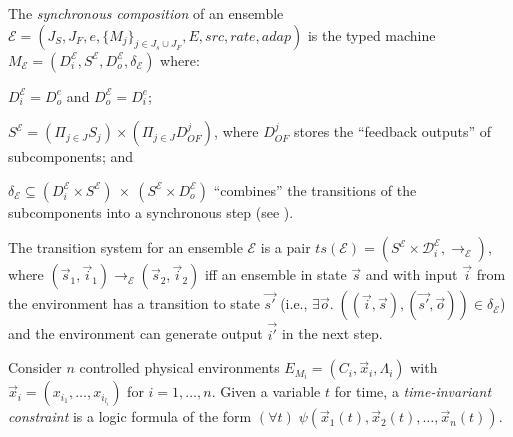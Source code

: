 \begin{definition}
The \emph{synchronous composition}
of  an ensemble
$\mathcal{E} = (J_S, J_F, e, \{M_j\}_{j\in J_s \cup J_F}, E, \mathit{src}, \mathit{rate}, \mathit{adap})$
is the typed machine
$ M_{\mathcal{E}} = ( D_i^{\mathcal{E}}, S^{\mathcal{E}},D_o^{\mathcal{E}}, \delta_{\mathcal{E}})$
where:
\begin{inparaenum}[(i)]
	\item $D_i^{\mathcal{E}} = D^e_o$ and  $D_o^{\mathcal{E}} = D^e_i$;
	\item $S^{\mathcal{E}} = (\Pi_{j\in J} S_j) \times (\Pi_{j\in J} D_{OF}^j)$, 
	where
	$D^j_{OF}$ stores the ``feedback outputs'' of subcomponents; and
	\item $ \delta_{\mathcal{E}} \subseteq 
	(D^{\mathcal{E}}_i\times S^{\mathcal{E}}) \:\times \: (S^{\mathcal{E}} \times D_o^{\mathcal{E}})$
	``combines''  the  transitions of the subcomponents
	 into a synchronous step (see \cite{pals-tcs}).
\end{inparaenum}
\end{definition}

\begin{definition}
The transition system for an ensemble $\mathcal{E}$ is a pair 
$\mathit{ts}(\mathcal{E}) = (S^{\mathcal{E}} \times \mathcal{D}_i^{\mathcal{E}}, \longrightarrow_{\mathcal{E}})$,
where $(\vec{s}_1,\vec{i}_1) \longrightarrow_{\mathcal{E}} (\vec{s}_2,\vec{i}_2)$
iff an ensemble in state $\vec{s}$ and with input
$\vec{i}$ from the environment has a transition to state $\vec{s'}$
(i.e., $\exists \vec{o}.\; ((\vec{i}, \vec{s}), (\vec{s'}, \vec{o})) \in \delta_{\mathcal{E}}$)
and the environment can generate output $\vec{i'}$ in the next step.
\end{definition}


\begin{definition}  
Consider $n$ controlled physical environments
$E_{M_i} = (C_i, {\vec{x}}_i, \Lambda_i)$
with $\vec{x}_i =  (x_{i_1}, \ldots,x_{i_{l_i}})$
for $i = 1,\ldots,n$.
Given a variable $t$ for time,
a \emph{time-invariant constraint}
is a logic formula of the form  
$(\forall t)\; \psi(\vec{x}_1(t), \vec{x}_2(t), \ldots, \vec{x}_n(t))$.
\end{definition}
